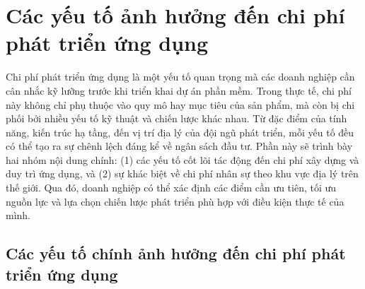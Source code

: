 \section{Các yếu tố ảnh hưởng đến chi phí phát triển ứng dụng}
\begin{flushleft}
  \hspace*{0.8cm}Chi phí phát triển ứng dụng là một yếu tố quan trọng mà các doanh nghiệp cần cân nhắc kỹ lưỡng trước khi triển khai dự án phần mềm. Trong thực tế, chi phí này không chỉ phụ thuộc vào quy mô hay mục tiêu của sản phẩm, mà còn bị chi phối bởi nhiều yếu tố kỹ thuật và chiến lược khác nhau. Từ đặc điểm của tính năng, kiến trúc hạ tầng, đến vị trí địa lý của đội ngũ phát triển, mỗi yếu tố đều có thể tạo ra sự chênh lệch đáng kể về ngân sách đầu tư. Phần này sẽ trình bày hai nhóm nội dung chính: (1) các yếu tố cốt lõi tác động đến chi phí xây dựng và duy trì ứng dụng, và (2) sự khác biệt về chi phí nhân sự theo khu vực địa lý trên thế giới. Qua đó, doanh nghiệp có thể xác định các điểm cần ưu tiên, tối ưu nguồn lực và lựa chọn chiến lược phát triển phù hợp với điều kiện thực tế của mình.
  \end{flushleft}
  
  
\subsection{Các yếu tố chính ảnh hưởng đến chi phí phát triển ứng dụng}
\renewcommand{\labelitemi}{--}  


